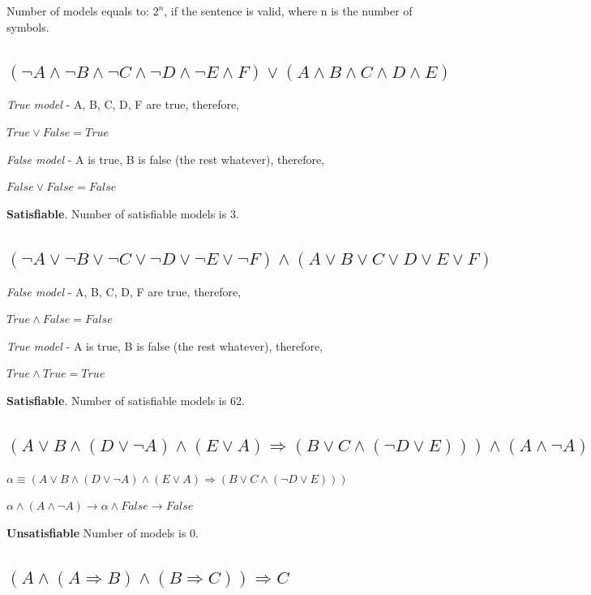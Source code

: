 \documentclass{article}                     %
\newcommand{\nt}[1]{\neg #1}
\begin{document}
	Number of models equals to: $ 2^n $, if the sentence is valid, where n is the number of symbols.
	
	\subsection{$ (\nt{A} \land \nt{B} \land \nt{C} \land \nt{D} \land \nt{E} \land F) \lor (A \land B \land C \land D \land E)$}
	\textit{True model} - A, B, C, D, F are true, therefore,
	
	$ True \lor False = True$
	
	\textit{False model} - A is true, B is false (the rest whatever), therefore,

	$ False \lor False = False $
	
	\textbf{Satisfiable}. Number of satisfiable models is 3.
	\subsection{$ (\nt{A} \lor \nt{B} \lor \nt{C} \lor \nt{D} \lor \nt{E} \lor \nt{F}) \land (A \lor B \lor C \lor D \lor E \lor F)$}
	\textit{False model} - A, B, C, D, F are true, therefore,
	
	$ True \land False = False$
	
	\textit{True model} - A is true, B is false (the rest whatever), therefore,
	
	$ True \land True = True $
	
	\textbf{Satisfiable}. Number of satisfiable models is 62.
	
	\subsection{$ (A \lor B \land (D \lor \nt{A}) \land (E \lor A) \Rightarrow  (B \lor C \land (\nt{D} \lor E))) \land (A \land \nt{A})$}
	
	$ \alpha \equiv (A \lor B \land (D \lor \nt{A}) \land (E \lor A) \Rightarrow  (B \lor C \land (\nt{D} \lor E))) $
	
	
	$ \alpha \land (A \land \nt{A}) \rightarrow \alpha \land False \rightarrow False $
	
	\textbf{Unsatisfiable}  Number of models is 0.
	
	\subsection{$ (A \land (A \Rightarrow B) \land (B \Rightarrow C)) \Rightarrow C $}
\end{document}
